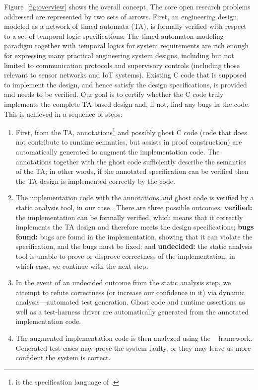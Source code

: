 Figure~\ref{fig:overview} shows the overall concept.  The core
open research problems addressed are represented by two sets of
arrows.  First, an engineering design, modeled as a network of timed
automata (TA), is formally verified with respect to a set of temporal logic specifications.
The timed automaton modeling paradigm together with temporal logics
for system requirements are rich enough for expressing many practical
engineering system designs, including but not limited to communication
protocols and supervisory controls (including those relevant to sensor
networks and IoT systems).  Existing C code that is supposed to
implement the design, and hence satisfy the design specifications, is provided and needs to be verified.
Our goal is to certify whether the C code truly implements the complete TA-based design and, if not, find any bugs in the code.
This is achieved in a sequence of steps:
\begin{enumerate}[labelsep=3pt,leftmargin=12pt]
\item First, from the TA, \acsl annotations\footnote{\acsl is the
    specification language of \framac{}.} and possibly ghost C code
  (code that does not contribute to runtime semantics, but assists in
  proof construction) are automatically generated to augment the
  implementation code. The annotations together with the ghost code
  sufficiently describe the semantics of the TA; in other words, if
  the annotated specification can be verified then the TA design is implemented correctly by the code.
\item The implementation code with the \acsl annotations and ghost code
  is verified by a static analysis tool, in our case \framac.
  There are three possible outcomes:
  {\bf verified:} the implementation can be formally verified, which means that it correctly implements the TA design and therefore meets the design specifications;
  {\bf bugs found:} bugs are found in the implementation, showing that
    it can violate the specification, and the bugs must be fixed; and
  {\bf undecided:} the static analysis tool is unable to prove or disprove correctness of the implementation,
  in which case, we continue with the next step.
\item In the event of an undecided outcome from the static analysis
  step, we attempt to refute correctness (or increase our confidence
  in it) via dynamic analysis---automated test generation.
  Ghost code and runtime assertions as well as a test-harness driver are automatically generated from the
  annotated implementation code.
\item The augmented implementation code is then analyzed using the
  \deepstate~\cite{DeepState} framework.  Generated test cases may
  prove the system faulty, or they may leave us more confident
  the system is correct.
\end{enumerate}

